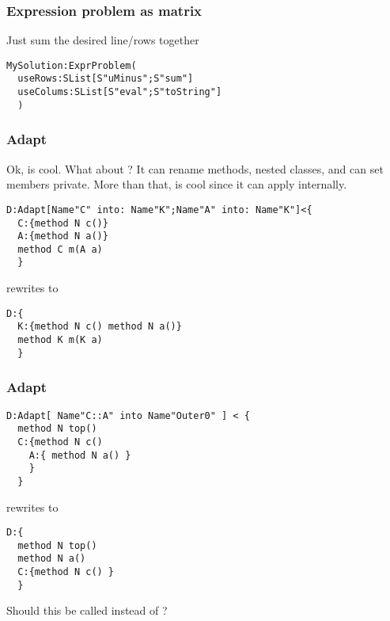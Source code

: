 \begin{frame}[fragile]
\frametitle{Expression problem as matrix}
Just sum the desired line/rows together
\begin{NiceCode}{59ex}{0.8}
\begin{lstlisting}
MySolution:ExprProblem(
  useRows:SList[S"uMinus";S"sum"]
  useColums:SList[S"eval";S"toString"]
  )
\end{lstlisting}
\end{NiceCode}




\end{frame}



\begin{frame}[fragile]
\frametitle{Adapt}
Ok, \Q@Use@ is cool.
What about \Q@Adapt@?
It can rename methods, nested classes, and can set members private.
More than that, \Q@Adapt@ is cool since it can apply \Q@Use@ internally.
\begin{NiceCode}{59ex}{0.8}
\begin{lstlisting}
D:Adapt[Name"C" into: Name"K";Name"A" into: Name"K"]<{
  C:{method N c()}
  A:{method N a()}
  method C m(A a)
  }
\end{lstlisting}
\end{NiceCode}
rewrites to 
\begin{NiceCode}{59ex}{0.8}
\begin{lstlisting}
D:{
  K:{method N c() method N a()}
  method K m(K a)
  }
\end{lstlisting}
\end{NiceCode}
\end{frame}


\begin{frame}[fragile]
\begin{NiceCode}{59ex}{0.8}
\frametitle{Adapt}
\begin{lstlisting}
D:Adapt[ Name"C::A" into Name"Outer0" ] < {
  method N top()
  C:{method N c()
    A:{ method N a() }
    }
  }
\end{lstlisting}
\end{NiceCode}
rewrites to 
\begin{NiceCode}{59ex}{0.8}
\begin{lstlisting}
D:{
  method N top()
  method N a()
  C:{method N c() }
  }
\end{lstlisting}
\end{NiceCode}
Should this be called \Q@Move@ instead of \Q@Adapt@?

\end{frame}



